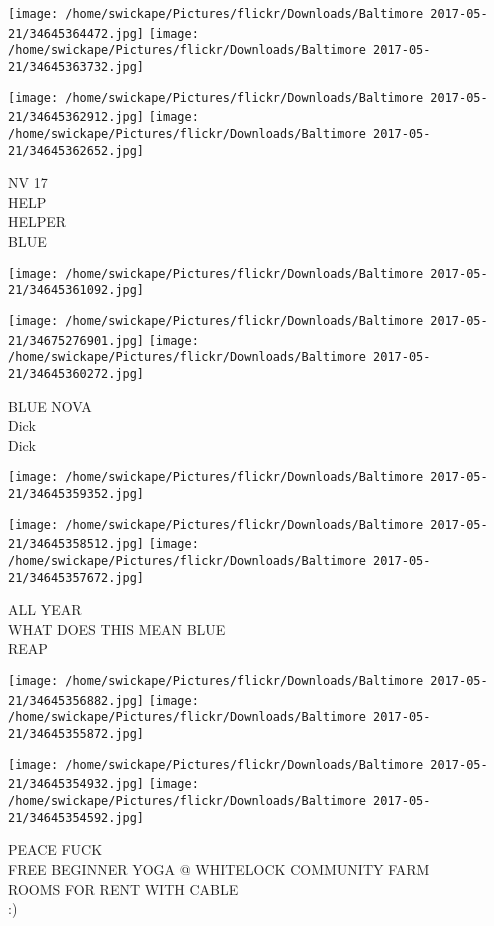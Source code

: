 \documentclass[10pt,letterpaper]{article}
\begin{document}
\texttt{[image: /home/swickape/Pictures/flickr/Downloads/Baltimore 2017-05-21/34645364472.jpg]}
\texttt{[image: /home/swickape/Pictures/flickr/Downloads/Baltimore 2017-05-21/34645363732.jpg]}

\texttt{[image: /home/swickape/Pictures/flickr/Downloads/Baltimore 2017-05-21/34645362912.jpg]}
\texttt{[image: /home/swickape/Pictures/flickr/Downloads/Baltimore 2017-05-21/34645362652.jpg]}

NV 17\\
HELP\\
HELPER\\
BLUE
\pagebreak

\texttt{[image: /home/swickape/Pictures/flickr/Downloads/Baltimore 2017-05-21/34645361092.jpg]}

\vspace{0.25in}
\texttt{[image: /home/swickape/Pictures/flickr/Downloads/Baltimore 2017-05-21/34675276901.jpg]}
\texttt{[image: /home/swickape/Pictures/flickr/Downloads/Baltimore 2017-05-21/34645360272.jpg]}

BLUE NOVA\\
Dick\\
Dick
\pagebreak

\texttt{[image: /home/swickape/Pictures/flickr/Downloads/Baltimore 2017-05-21/34645359352.jpg]}

\vspace{0.25in}
\texttt{[image: /home/swickape/Pictures/flickr/Downloads/Baltimore 2017-05-21/34645358512.jpg]}
\texttt{[image: /home/swickape/Pictures/flickr/Downloads/Baltimore 2017-05-21/34645357672.jpg]}

ALL YEAR\\
WHAT DOES THIS MEAN BLUE\\
REAP
\pagebreak

\texttt{[image: /home/swickape/Pictures/flickr/Downloads/Baltimore 2017-05-21/34645356882.jpg]}
\texttt{[image: /home/swickape/Pictures/flickr/Downloads/Baltimore 2017-05-21/34645355872.jpg]}

\texttt{[image: /home/swickape/Pictures/flickr/Downloads/Baltimore 2017-05-21/34645354932.jpg]}
\texttt{[image: /home/swickape/Pictures/flickr/Downloads/Baltimore 2017-05-21/34645354592.jpg]}

PEACE FUCK\\
FREE BEGINNER YOGA @ WHITELOCK COMMUNITY FARM\\
ROOMS FOR RENT WITH CABLE\\
:)
\pagebreak
\end{document}
